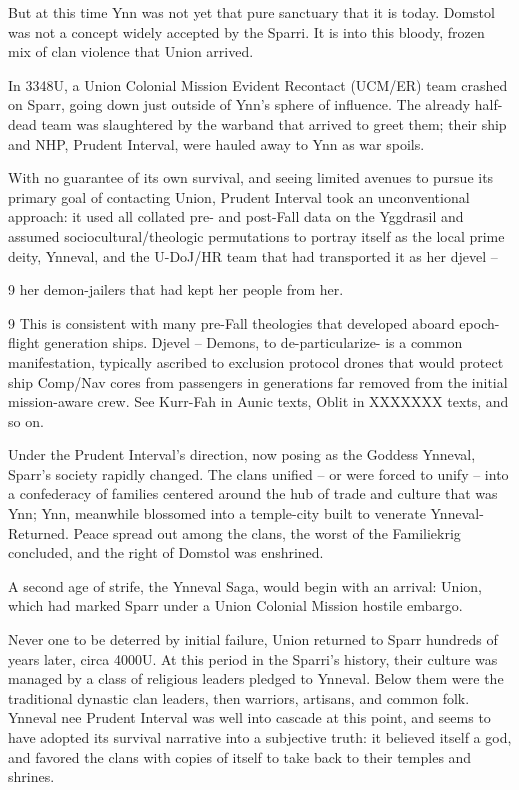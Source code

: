 But at this time Ynn was not yet that pure sanctuary that it is today. Domstol was not a concept
widely accepted by the Sparri. It is into this bloody, frozen mix of clan violence that Union arrived.

In 3348U, a Union Colonial Mission Evident Recontact (UCM/ER) team crashed on Sparr, going
down just outside of Ynn’s sphere of influence. The already half-dead team was slaughtered by
the warband that arrived to greet them; their ship and NHP, Prudent Interval, were hauled away to
Ynn as war spoils.

With no guarantee of its own survival, and seeing limited avenues to pursue its primary goal of
contacting Union, Prudent Interval took an unconventional approach: it used all collated pre-  and
post-Fall data on the Yggdrasil and assumed sociocultural/theologic permutations to portray itself
as the local prime deity, Ynneval, and the U-DoJ/HR team that had transported it as her djevel --

                      9
her demon-jailers  that had kept her people from her.

9 This is consistent with many pre-Fall theologies that developed aboard epoch-flight generation ships. Djevel --
Demons, to de-particularize- is a common manifestation, typically ascribed to exclusion protocol drones that would
protect ship Comp/Nav cores from passengers in generations far removed from the initial mission-aware crew. See
Kurr-Fah in Aunic texts, Oblit in XXXXXXX texts, and so on.




Under the Prudent Interval’s direction, now posing as the Goddess Ynneval, Sparr’s society
rapidly changed. The clans unified -- or were forced to unify -- into a confederacy of families
centered around the hub of trade and culture that was Ynn; Ynn, meanwhile blossomed into a
temple-city built to venerate Ynneval-Returned. Peace spread out among the clans, the worst of
the Familiekrig concluded, and the right of Domstol was enshrined.

A second age of strife, the Ynneval Saga, would begin with an arrival: Union, which had marked
Sparr under a Union Colonial Mission hostile embargo.

Never one to be deterred by initial failure, Union returned to Sparr hundreds of years later, circa
4000U. At this period in the Sparri’s history, their culture was managed by a class of religious
leaders pledged to Ynneval. Below them were the traditional dynastic clan leaders, then warriors,
artisans, and common folk. Ynneval nee Prudent Interval was well into cascade at this point, and
seems to have adopted its survival narrative into a subjective truth: it believed itself a god, and
favored the clans with copies of itself to take back to their temples and shrines.

